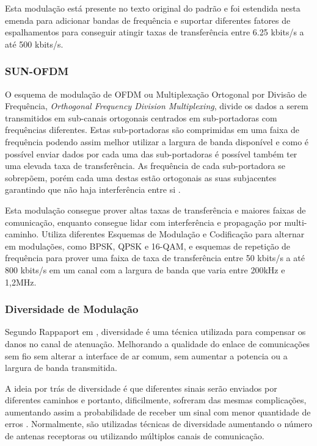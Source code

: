Esta modulação está presente no texto original do padrão e foi estendida nesta emenda para adicionar bandas de frequência e suportar diferentes fatores de espalhamentos para conseguir atingir taxas de transferência entre 6.25 kbits/s a até 500 kbits/s.

\subsubsection*{SUN-OFDM}
O esquema de modulação de OFDM ou Multiplexação Ortogonal por Divisão de Frequência, \emph{Orthogonal Frequency Division Multiplexing}, divide os dados a serem transmitidos em sub-canais ortogonais centrados em  sub-portadoras com frequências diferentes. Estas sub-portadoras são comprimidas em uma faixa de frequência podendo assim melhor utilizar a largura de banda disponível e como é possível enviar dados por cada uma das sub-portadoras é possível também ter uma elevada taxa de transferência. As frequência de cada sub-portadora se sobrepõem, porém cada uma destas estão ortogonais as suas subjacentes garantindo que não haja interferência entre si \cite{rappaport2009}\cite{goldsmith2005wireless}.

Esta modulação consegue prover altas taxas de transferência e maiores faixas de comunicação, enquanto consegue lidar com interferência e propagação por multi-caminho. Utiliza diferentes Esquemas de Modulação e Codificação para alternar em modulações, como BPSK, QPSK e 16-QAM, e esquemas de repetição de frequência para prover uma faixa de taxa de transferência entre 50 kbits/s a até 800 kbits/s em um canal com a largura de banda que varia entre 200kHz e 1,2MHz.

\subsubsection*{Diversidade de Modulação}
Segundo Rappaport em \cite{rappaport2009}, diversidade é uma técnica utilizada para compensar os danos no canal de atenuação. Melhorando  a qualidade do enlace de comunicações sem fio sem alterar a interface de ar comum, sem aumentar a potencia ou a largura de banda transmitida.

A ideia por trás de diversidade é que diferentes sinais serão enviados por diferentes caminhos e portanto, dificilmente, sofreram das mesmas complicações, aumentando assim a probabilidade de receber um sinal com menor quantidade de erros \cite{goldsmith2005wireless}. Normalmente, são utilizadas técnicas de diversidade aumentando o número de antenas receptoras ou utilizando múltiplos canais de comunicação.

